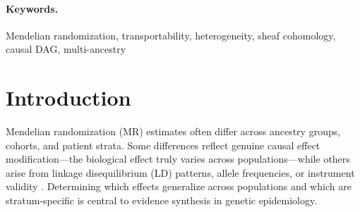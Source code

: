 \documentclass[11pt]{article}
\begin{document}
\begin{abstract}
\noindent\textbf{Vector-valued extension.}
On vector-valued stalks (multivariate effect estimates with $d > 1$ traits), the sheaf--Cochran equivalence breaks: the multivariate sheaf $Q$ detects \emph{effect vector rotation}---where per-trait effect magnitudes are preserved but the joint direction of the effect vector changes across ancestries---that $d$ independent scalar $Q$ tests cannot detect. We demonstrate this on 7 pleiotropic loci from Pan-UK Biobank multi-ancestry GWAS (25 blood cell traits, 6 ancestry groups). The ACKR1/Duffy locus serves as a biological positive control: the vector $Q_V = 561.6$ ($p < 10^{-300}$, $\chi^2_{125}$) detects coordinated myeloid-lineage heterogeneity while 20 of 25 individual scalar $Q$ tests are non-significant. Five of seven significant loci are ``rotation-only''---detected by vector $Q_V$ but missed by every Bonferroni-corrected scalar test---with a median $Q_V / \sum Q_j^{\mathrm{scalar}}$ ratio of 1.43.

\noindent\textbf{Conclusions.}
Per-edge $Q$ testing correctly classifies scalar transportability whenever statistical power is adequate. The vector-valued extension captures a qualitatively different failure mode---effect vector rotation across ancestries---that per-trait scalar testing misses. The one scalar exception---where expanding the ancestry set changes the verdict---empirically demonstrates that transportability verdicts are population-set-dependent, a property that global meta-analytic tests cannot detect.
\end{abstract}

\paragraph{Keywords.} Mendelian randomization, transportability, heterogeneity, sheaf cohomology, causal DAG, multi-ancestry

\section{Introduction}
\label{sec:intro}

Mendelian randomization (MR) estimates often differ across ancestry groups, cohorts, and patient strata.
Some differences reflect genuine causal effect modification---the biological effect truly varies across populations---while others arise from linkage disequilibrium (LD) patterns, allele frequencies, or instrument validity \citep{daveysmith2014mendelian}.
Determining which effects generalize across populations and which are stratum-specific is central to evidence synthesis in genetic epidemiology.
\end{document}
